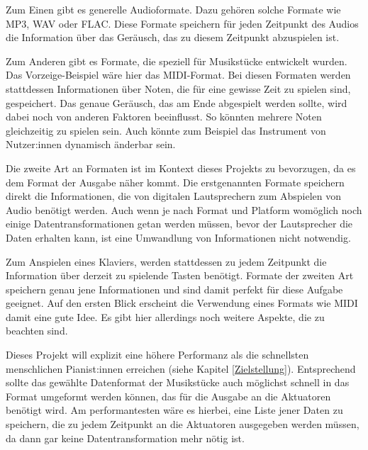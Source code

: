 Zum Einen gibt es generelle Audioformate. Dazu gehören solche Formate wie MP3, WAV oder FLAC.
Diese Formate speichern für jeden Zeitpunkt des Audios die Information über das Geräusch, das zu diesem Zeitpunkt abzuspielen ist.

Zum Anderen gibt es Formate, die speziell für Musikstücke entwickelt wurden.
Das Vorzeige-Beispiel wäre hier das \ac{MIDI}-Format.
Bei diesen Formaten werden stattdessen Informationen über Noten, die für eine gewisse Zeit zu spielen sind, gespeichert.
Das genaue Geräusch, das am Ende abgespielt werden sollte, wird dabei noch von anderen Faktoren beeinflusst.
So könnten mehrere Noten gleichzeitig zu spielen sein.
Auch könnte zum Beispiel das Instrument von Nutzer:innen dynamisch änderbar sein.

Die zweite Art an Formaten ist im Kontext dieses Projekts zu bevorzugen, da es dem Format der Ausgabe näher kommt.
Die erstgenannten Formate speichern direkt die Informationen, die von digitalen Lautsprechern zum Abspielen von Audio benötigt werden.
Auch wenn je nach Format und Platform womöglich noch einige Datentransformationen getan werden müssen, bevor der Lautsprecher die Daten erhalten kann, ist eine Umwandlung von Informationen nicht notwendig.

Zum Anspielen eines Klaviers, werden stattdessen zu jedem Zeitpunkt die Information über derzeit zu spielende Tasten benötigt.
Formate der zweiten Art speichern genau jene Informationen und sind damit perfekt für diese Aufgabe geeignet.
Auf den ersten Blick erscheint die Verwendung eines Formats wie \ac{MIDI} damit eine gute Idee.
Es gibt hier allerdings noch weitere Aspekte, die zu beachten sind.

Dieses Projekt will explizit eine höhere Performanz als die schnellsten menschlichen Pianist:innen erreichen (siehe Kapitel \ref*{Zielstellung}).
Entsprechend sollte das gewählte Datenformat der Musikstücke auch möglichst schnell in das Format umgeformt werden können, das für die Ausgabe an die Aktuatoren benötigt wird.
Am performantesten wäre es hierbei, eine Liste jener Daten zu speichern, die zu jedem Zeitpunkt an die Aktuatoren ausgegeben werden müssen, da dann gar keine Datentransformation mehr nötig ist.

